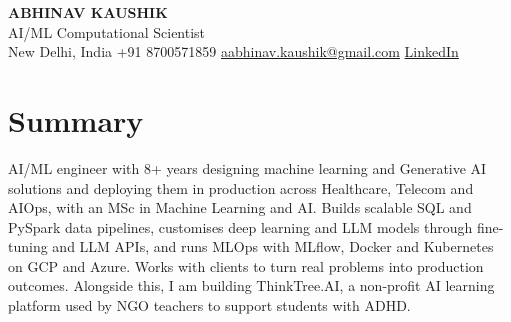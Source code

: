 \documentclass[10pt,a4paper]{article}
\begin{document}
\begin{center}
  {\LARGE\bfseries ABHINAV KAUSHIK}\\[2pt]
  {\large AI/ML Computational Scientist}\\[2pt]
  New Delhi, India \textbar{} +91 8700571859 \textbar{} \href{mailto:aabhinav.kaushik@gmail.com}{aabhinav.kaushik@gmail.com} \textbar{} \href{https://www.linkedin.com/in/abhinav-kaushik10/}{LinkedIn}  
\end{center}

\section{Summary}
AI/ML engineer with 8+ years designing machine learning and Generative AI solutions and deploying them in production across Healthcare, Telecom and AIOps, with an MSc in Machine Learning and AI. Builds scalable SQL and PySpark data pipelines, customises deep learning and LLM models through fine-tuning and LLM APIs, and runs MLOps with MLflow, Docker and Kubernetes on GCP and Azure. Works with clients to turn real problems into production outcomes. Alongside this, I am building ThinkTree.AI, a non-profit AI learning platform used by NGO teachers to support students with ADHD.
\end{document}

